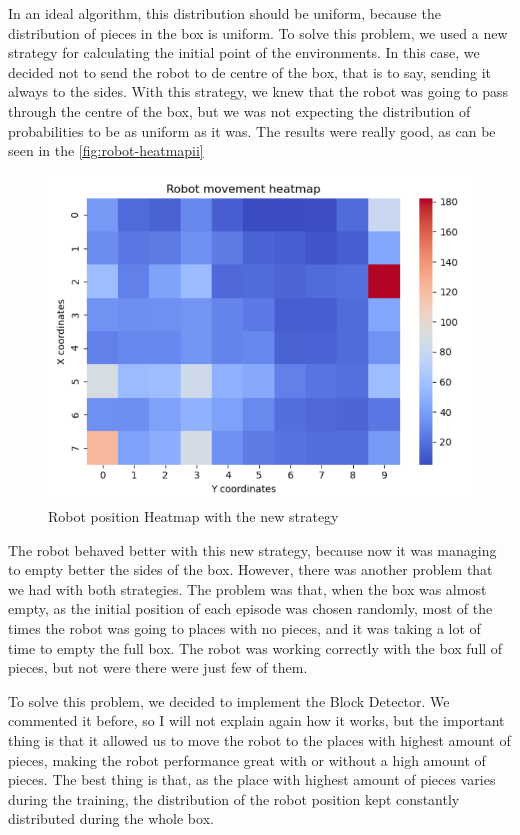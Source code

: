 			In an ideal algorithm, this distribution should be uniform, because the distribution of pieces in the box is uniform. To solve this problem, we used a new strategy for calculating the initial point of the environments. In this case, we decided not to send the robot to de centre of the box, that is to say, sending it always to the sides. With this strategy, we knew that the robot was going to pass through the centre of the box, but we was not expecting the distribution of probabilities to be as uniform as it was. The results were really good, as can be seen in the \autoref{fig:robot-heatmapii}
		
			\begin{figure}[H]
				\centering
				\includegraphics[width=0.9\linewidth]{"Images/Robot HeatmapII"}
				\caption[Heatmap robot II]{Robot position Heatmap with the new strategy}
				\label{fig:robot-heatmapii}
			\end{figure}
		
			The robot behaved better with this new strategy, because now it was managing to empty better the sides of the box. However, there was another problem that we had with both strategies. The problem was that, when the box was almost empty, as the initial position of each episode was chosen randomly, most of the times the robot was going to places with no pieces, and it was taking a lot of time to empty the full box. The robot was working correctly with the box full of pieces, but not were there were just few of them.
			
			To solve this problem, we decided to implement the Block Detector. We commented it before, so I will not explain again how it works, but the important thing is that it allowed us to move the robot to the places with highest amount of pieces, making the robot performance great with or without a high amount of pieces. The best thing is that, as the place with highest amount of pieces varies during the training, the distribution of the robot position kept constantly distributed during the whole box.
			
		
		
			
			
				
				
			
				